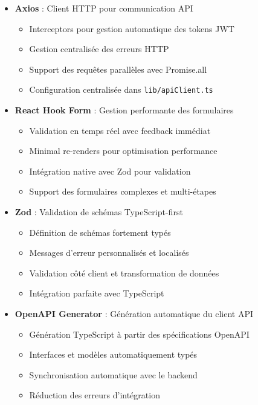 \documentclass[12pt,a4paper]{report}
\begin{document}
\begin{itemize}
\item \textbf{Axios} : Client HTTP pour communication API
  \begin{itemize}
  \item Interceptors pour gestion automatique des tokens JWT
  \item Gestion centralisée des erreurs HTTP
  \item Support des requêtes parallèles avec Promise.all
  \item Configuration centralisée dans \texttt{lib/apiClient.ts}
  \end{itemize}

\item \textbf{React Hook Form} : Gestion performante des formulaires
  \begin{itemize}
  \item Validation en temps réel avec feedback immédiat
  \item Minimal re-renders pour optimisation performance
  \item Intégration native avec Zod pour validation
  \item Support des formulaires complexes et multi-étapes
  \end{itemize}

\item \textbf{Zod} : Validation de schémas TypeScript-first
  \begin{itemize}
  \item Définition de schémas fortement typés
  \item Messages d'erreur personnalisés et localisés
  \item Validation côté client et transformation de données
  \item Intégration parfaite avec TypeScript
  \end{itemize}

\item \textbf{OpenAPI Generator} : Génération automatique du client API
  \begin{itemize}
  \item Génération TypeScript à partir des spécifications OpenAPI
  \item Interfaces et modèles automatiquement typés
  \item Synchronisation automatique avec le backend
  \item Réduction des erreurs d'intégration
  \end{itemize}
\end{itemize}
\end{document}
